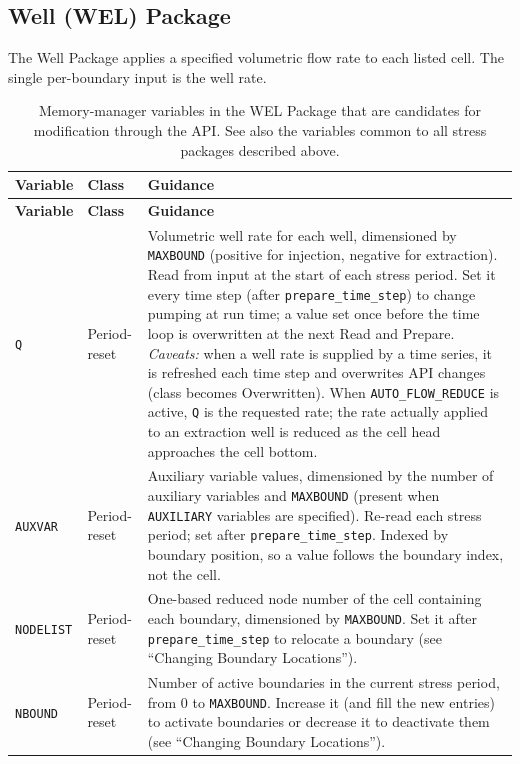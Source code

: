 \subsection{Well (WEL) Package}

The Well Package applies a specified volumetric flow rate to each listed cell.
The single per-boundary input is the well rate.

\begin{longtable}{p{} p{} p{}}
\caption{Memory-manager variables in the WEL Package that are candidates for
modification through the API. See also the variables common to all stress
packages described above.} \label{table:api-gwf-wel} \\

\hline
\textbf{Variable} & \textbf{Class} & \textbf{Guidance} \\
\hline
\endfirsthead

\hline
\textbf{Variable} & \textbf{Class} & \textbf{Guidance} \\
\hline
\endhead

\texttt{Q} & Period-reset &
Volumetric well rate for each well, dimensioned by \texttt{MAXBOUND} (positive
for injection, negative for extraction). Read from input at the start of each
stress period. Set it every time step (after \texttt{prepare\_time\_step}) to
change pumping at run time; a value set once before the time loop is overwritten
at the next Read and Prepare. \emph{Caveats:} when a well rate is supplied by a
time series, it is refreshed each time step and overwrites API changes (class
becomes Overwritten). When \texttt{AUTO\_FLOW\_REDUCE} is active, \texttt{Q} is
the requested rate; the rate actually applied to an extraction well is reduced as
the cell head approaches the cell bottom. \\

\texttt{AUXVAR} & Period-reset &
Auxiliary variable values, dimensioned by the number of auxiliary variables and
\texttt{MAXBOUND} (present when \texttt{AUXILIARY} variables are specified).
Re-read each stress period; set after \texttt{prepare\_time\_step}. Indexed by
boundary position, so a value follows the boundary index, not the cell. \\

\texttt{NODELIST} & Period-reset &
One-based reduced node number of the cell containing each boundary, dimensioned
by \texttt{MAXBOUND}. Set it after \texttt{prepare\_time\_step} to relocate a
boundary (see ``Changing Boundary Locations''). \\

\texttt{NBOUND} & Period-reset &
Number of active boundaries in the current stress period, from 0 to
\texttt{MAXBOUND}. Increase it (and fill the new entries) to activate boundaries
or decrease it to deactivate them (see ``Changing Boundary Locations''). \\

\hline
\end{longtable}
